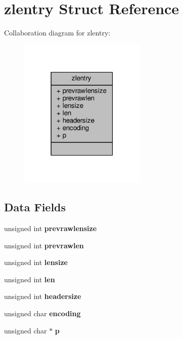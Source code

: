 \hypertarget{structzlentry}{}\section{zlentry Struct Reference}
\label{structzlentry}


Collaboration diagram for zlentry\+:\nopagebreak
\begin{figure}[H]
\begin{center}
\leavevmode
\includegraphics[width=171pt]{structzlentry__coll__graph}
\end{center}
\end{figure}
\subsection*{Data Fields}
\begin{DoxyCompactItemize}
\item 
\mbox{\label{structzlentry_a768061947ee172be656985b45b482dcc}} 
unsigned int {\bfseries prevrawlensize}
\item 
\mbox{\label{structzlentry_a9442ecbe1369042aabf42e5eca19d471}} 
unsigned int {\bfseries prevrawlen}
\item 
\mbox{\label{structzlentry_a3c93675d93d87e94c7a860b739156c06}} 
unsigned int {\bfseries lensize}
\item 
\mbox{\label{structzlentry_a194c63ce78ae85d0516ccd7ca0296666}} 
unsigned int {\bfseries len}
\item 
\mbox{\label{structzlentry_aab92ade10c45021bc4293f37130bf066}} 
unsigned int {\bfseries headersize}
\item 
\mbox{\label{structzlentry_ae9e4799b790e81d1b0d1406894b4bc27}} 
unsigned char {\bfseries encoding}
\item 
\mbox{\label{structzlentry_a157a43a064e79250f610936cebfc244a}} 
unsigned char $\ast$ {\bfseries p}
\end{DoxyCompactItemize}


